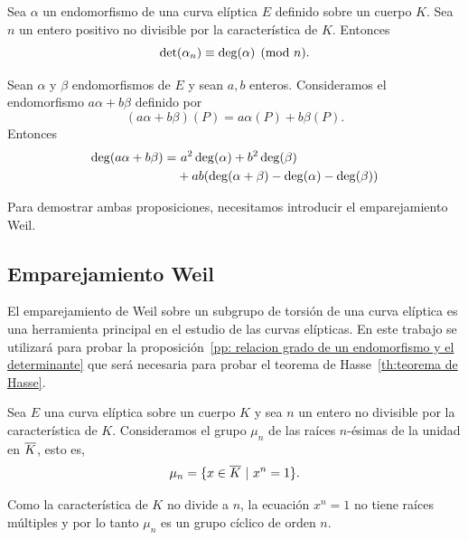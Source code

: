 \begin{proposicion}\label{pp: relacion grado de un endomorfismo y el determinante}
	Sea $\alpha$ un endomorfismo de una curva elíptica $E$ definido sobre un cuerpo $K$. Sea $n$ un entero positivo no divisible por la característica de $K$. Entonces
	$$
		\det(\alpha_n) \equiv \deg(\alpha) \pmod{n}.
	$$
\end{proposicion}

\begin{proposicion}\label{pp:grado endomorfismo a*alpha + b*beta}
	Sean $\alpha$ y $\beta$ endomorfismos de $E$ y sean $a, b$ enteros. Consideramos el endomorfismo $a \alpha + b \beta$ definido por
	$$
		(a \alpha + b \beta)(P) = a \alpha(P) + b \beta(P).
	$$
	Entonces
	\begin{align*}
		\deg(a \alpha + b \beta) =& \ a^2 \deg(\alpha) + b^2 \deg(\beta) \\
		&+ a b (\deg(\alpha + \beta) - \deg(\alpha) - \deg(\beta))
	\end{align*}
\end{proposicion}

Para demostrar ambas proposiciones, necesitamos introducir el emparejamiento Weil.

\subsection{Emparejamiento Weil}
\label{subs:Emparejamiento Weil}

El emparejamiento de Weil sobre un subgrupo de torsión de una curva elíptica es una herramienta principal en el estudio de las curvas elípticas. En este trabajo se utilizará para probar la proposición~\ref{pp: relacion grado de un endomorfismo y el determinante} que será necesaria para probar el teorema de Hasse~\ref{th:teorema de Hasse}.

Sea $E$ una curva elíptica sobre un cuerpo $K$ y sea $n$ un entero no divisible por la característica de $K$. Consideramos el grupo $\mu_n$ de las raíces $n$-ésimas de la unidad en $\overline{K}$, esto es,
$$
	\mu_n = \{ x \in \overline{K} \ | \ x^n = 1 \}.
$$

Como la característica de $K$ no divide a $n$, la ecuación $x^n = 1$ no tiene raíces múltiples y por lo tanto $\mu_n$ es un grupo cíclico de orden $n$.

